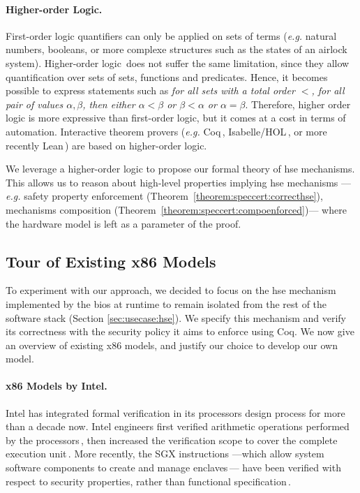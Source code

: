 \paragraph{Higher-order Logic.}
%
First-order logic quantifiers can only be applied on sets of terms (\emph{e.g.}
natural numbers, booleans, or more complexe structures such as the states of an
airlock system).
%
Higher-order logic\,\cite{leivant1994hol} does not suffer the same limitation,
since they allow quantification over sets of sets, functions and predicates.
%
Hence, it becomes possible to express statements such as \emph{for all sets with
  a total order \( < \), for all pair of values \( \alpha, \beta \), then either
  \( \alpha < \beta \) or \( \beta < \alpha \) or \( \alpha = \beta \)}.
%
Therefore, higher order logic is more expressive than first-order logic, but it
comes at a cost in terms of automation.
%
Interactive theorem provers (\emph{e.g.}  Coq\,\cite{coq},
Isabelle/HOL\,\cite{nipkow2002isabelle}, or more recently
Lean\,\cite{de2015lean}) are based on higher-order logic.

We leverage a higher-order logic to propose our formal theory of \ac{hse}
mechanisms.
%
This allows us to reason about high-level properties implying \ac{hse}
mechanisms ---\emph{e.g.} safety property enforcement
(Theorem~\ref{theorem:speccert:correcthse}), mechanisms composition
(Theorem~\ref{theorem:speccert:compoenforced})--- where the hardware model is
left as a parameter of the proof.

\subsection{Tour of Existing x86 Models}
\label{subsec:sota:ltsrelated}

To experiment with our approach, we decided to focus on the \ac{hse} mechanism
implemented by the \ac{bios} at runtime to remain isolated from the rest of the
software stack (Section \ref{sec:usecase:hse}). We specify this mechanism and
verify its correctness with the security policy it aims to enforce using Coq.
%
We now give an overview of existing x86 models, and justify our choice to
develop our own model.

\paragraph{x86 Models by Intel.}
%
Intel has integrated formal verification in its processors design process for
more than a decade now.
%
Intel engineers first verified arithmetic operations performed by the
processors\,\cite{harrison2000x86}, then increased the verification scope to
cover the complete execution unit\,\cite{kaivola2009formalintel}.
%
More recently, the SGX instructions ---which allow system software components to
create and manage enclaves\,\cite{costan2016sgxexplained}--- have been verified
with respect to security properties, rather than functional
specification\,\cite{leslie2015linsgx}.
%

